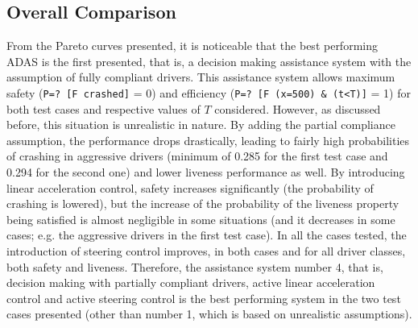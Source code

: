 
\subsection{Overall Comparison}

From the Pareto curves presented, it is noticeable that the best performing ADAS is the first presented, that is, a decision making assistance system with the assumption of fully compliant drivers. This assistance system allows maximum safety (\texttt{P=? [F crashed]} = 0) and efficiency (\texttt{P=? [F (x=500) \& (t<T)]} = 1) for both test cases and respective values of $T$ considered. However, as discussed before, this situation is unrealistic in nature. By adding the partial compliance assumption, the performance drops drastically, leading to fairly high probabilities of crashing in aggressive drivers (minimum of 0.285 for the first test case and 0.294 for the second one) and lower liveness performance as well. By introducing linear acceleration control, safety increases significantly (the probability of crashing is lowered), but the increase of the probability of the liveness property being satisfied is almost negligible in some situations (and it decreases in some cases; e.g. the aggressive drivers in the first test case). In all the cases tested, the introduction of steering control improves, in both cases and for all driver classes, both safety and liveness. Therefore, the assistance system number 4, that is, decision making with partially compliant drivers, active linear acceleration control and active steering control is the best performing system in the two test cases presented (other than number 1, which is based on unrealistic assumptions).

